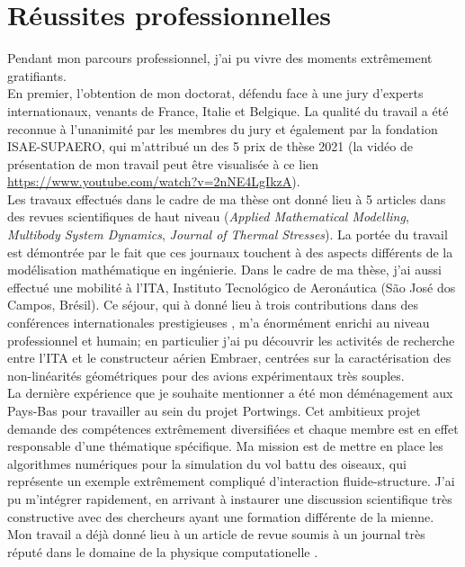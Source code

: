 \documentclass[12pt, french]{article}
\begin{document}
	
	\section{Réussites professionnelles}
	
	Pendant mon parcours professionnel, j'ai pu vivre des moments extrêmement gratifiants. \\
	
	En premier, l'obtention de mon doctorat, défendu face à une jury d'experts internationaux, venants de France, Italie et Belgique. La qualité du travail a été reconnue à l'unanimité par les membres du jury et également par la fondation ISAE-SUPAERO, qui m'attribué un des 5 prix de thèse 2021 (la vidéo de présentation de mon travail peut être visualisée à ce lien \url{https://www.youtube.com/watch?v=2nNE4LgIkzA}). \\
	
	Les travaux effectués dans le cadre de ma thèse ont donné lieu à 5 articles dans des revues scientifiques de haut niveau  (\textit{Applied Mathematical Modelling}, \textit{Multibody System Dynamics}, \textit{Journal of Thermal Stresses}). La portée du travail est démontrée par le fait que ces journaux touchent à des aspects différents de la modélisation mathématique en ingénierie. Dans le cadre de ma thèse, j'ai aussi effectué une  mobilité à l'ITA, Instituto Tecnol\'ogico de Aeron\'autica (São José dos Campos, Brésil). Ce séjour, qui à donné lieu à trois contributions dans des conférences internationales prestigieuses , m'a énormément enrichi au niveau professionnel et humain; en particulier j'ai pu découvrir les activités de recherche entre l'ITA et le constructeur aérien Embraer, centrées sur la caractérisation des non-linéarités géométriques pour des avions expérimentaux très souples.  \\
	
	La dernière expérience que je souhaite mentionner a été mon déménagement aux Pays-Bas pour travailler au sein du projet Portwings. Cet ambitieux projet demande des compétences extrêmement diversifiées et chaque membre est en effet responsable d'une thématique spécifique. \newline Ma mission est de mettre en place les algorithmes numériques pour la simulation du vol battu des oiseaux, qui représente un exemple extrêmement compliqué d'interaction fluide-structure. J'ai pu m'intégrer rapidement, en arrivant à instaurer une discussion scientifique très constructive avec des chercheurs ayant une formation différente de la mienne. Mon travail a déjà donné lieu à un article de revue soumis à un journal très réputé dans le domaine de la physique computationelle . 
	
\end{document}

